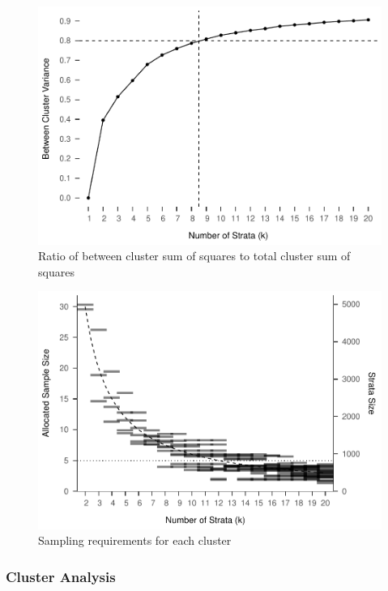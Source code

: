 \documentclass[man,floatsintext]{apa6}
\theoremstyle{definition}
\theoremstyle{definition}
\theoremstyle{definition}
\theoremstyle{remark}
\begin{document}
\begin{figure}
\centering
\includegraphics{GenSamp_Paper_files/figure-latex/fig-ratio-1.pdf}
\caption{\label{fig:fig-ratio}Ratio of between cluster sum of squares to
total cluster sum of squares}
\end{figure}

\begin{figure}
\centering
\includegraphics{GenSamp_Paper_files/figure-latex/fig-k-size-1.pdf}
\caption{\label{fig:fig-k-size}Sampling requirements for each cluster}
\end{figure}

\hypertarget{cluster-analysis}{%
\subsubsection{Cluster Analysis}\label{cluster-analysis}}
\end{document}
